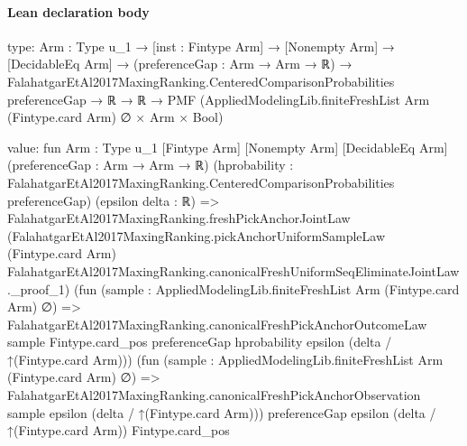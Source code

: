 \documentclass[10pt]{article}
\begin{document}
\paragraph{Lean declaration body}
\begin{ReviewVerbatim}
type:
{Arm : Type u_1} →
  [inst : Fintype Arm] →
    [Nonempty Arm] →
      [DecidableEq Arm] →
        (preferenceGap : Arm → Arm → ℝ) →
          FalahatgarEtAl2017MaxingRanking.CenteredComparisonProbabilities preferenceGap →
            ℝ → ℝ → PMF (AppliedModelingLib.finiteFreshList Arm (Fintype.card Arm) ∅ × Arm × Bool)

value:
fun {Arm : Type u_1} [Fintype Arm] [Nonempty Arm] [DecidableEq Arm] (preferenceGap : Arm → Arm → ℝ)
    (hprobability : FalahatgarEtAl2017MaxingRanking.CenteredComparisonProbabilities preferenceGap)
    (epsilon delta : ℝ) =>
  FalahatgarEtAl2017MaxingRanking.freshPickAnchorJointLaw
    (FalahatgarEtAl2017MaxingRanking.pickAnchorUniformSampleLaw (Fintype.card Arm)
      FalahatgarEtAl2017MaxingRanking.canonicalFreshUniformSeqEliminateJointLaw._proof_1)
    (fun (sample : AppliedModelingLib.finiteFreshList Arm (Fintype.card Arm) ∅) =>
      FalahatgarEtAl2017MaxingRanking.canonicalFreshPickAnchorOutcomeLaw sample Fintype.card_pos preferenceGap
        hprobability epsilon (delta / ↑(Fintype.card Arm)))
    (fun (sample : AppliedModelingLib.finiteFreshList Arm (Fintype.card Arm) ∅) =>
      FalahatgarEtAl2017MaxingRanking.canonicalFreshPickAnchorObservation sample epsilon (delta / ↑(Fintype.card Arm)))
    preferenceGap epsilon (delta / ↑(Fintype.card Arm)) Fintype.card_pos
\end{ReviewVerbatim}
\end{document}
